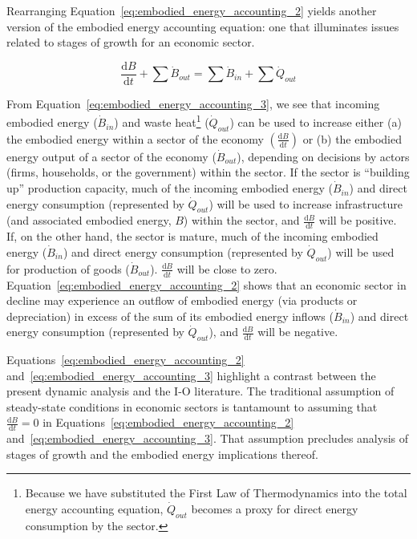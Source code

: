 Rearranging Equation~\ref{eq:embodied_energy_accounting_2}
yields another version of the embodied energy accounting equation:
one that illuminates issues related to 
stages of growth for an economic sector.

\begin{equation} \label{eq:embodied_energy_accounting_3}
	\frac{\mathrm{d}B}{\mathrm{d}t} 
	+ \sum \dot{B}_{out}
	= \sum \dot{B}_{in}
	+ \sum \dot{Q}_{out}
\end{equation}

\noindent From Equation~\ref{eq:embodied_energy_accounting_3},
we see that incoming embodied energy ($\dot{B}_{in}$) and 
waste heat\footnote{Because we have substituted 
the First Law of Thermodynamics into the total energy accounting equation,
$\dot{Q}_{out}$ becomes a proxy for direct energy consumption by the sector.} 
($\dot{Q}_{out}$) can be used to increase either (a)
the embodied energy within a sector of the economy 
$\left( \frac{\mathrm{d}B}{\mathrm{d}t}  \right)$
or (b) the embodied energy output of a sector of the economy 
($\dot{B}_{out}$), 
depending on decisions by actors 
(firms, households, or the government) 
within the sector. 
If the sector is ``building up'' production capacity, 
much of the incoming embodied energy ($\dot{B}_{in}$)
and direct energy consumption (represented by $\dot{Q}_{out}$)
will be used to increase infrastructure 
(and associated embodied energy, $B$) within the sector, 
and $\frac{\mathrm{d}B}{\mathrm{d}t}$ will be positive.
If, on the other hand, the sector is mature, 
much of the incoming embodied energy ($\dot{B}_{in}$)
and direct energy consumption (represented by $\dot{Q}_{out}$)
will be used for production of goods ($\dot{B}_{out}$).
$\frac{\mathrm{d}B}{\mathrm{d}t}$ will be close to zero.
Equation~\ref{eq:embodied_energy_accounting_2} shows that
an economic sector in decline may experience an outflow 
of embodied energy (via products or depreciation)
in excess of the sum of 
its embodied energy inflows ($\dot{B}_{in}$)
and direct energy consumption (represented by $\dot{Q}_{out}$),
and $\frac{\mathrm{d}B}{\mathrm{d}t}$ will be negative.

Equations~\ref{eq:embodied_energy_accounting_2}
and~\ref{eq:embodied_energy_accounting_3} 
highlight a contrast between 
the present dynamic analysis and the I-O literature.
The traditional assumption of steady-state conditions 
in economic sectors is tantamount to assuming that
$\frac{\mathrm{d}B}{\mathrm{d}t} = 0$ in 
Equations~\ref{eq:embodied_energy_accounting_2}
and~\ref{eq:embodied_energy_accounting_3}.
That assumption precludes analysis of stages of growth 
and the embodied energy implications thereof.

